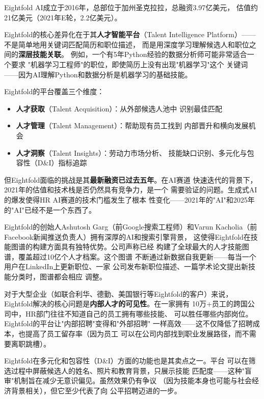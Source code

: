 Eightfold AI成立于2016年，总部位于加州圣克拉拉，总融资3.97亿美元，
估值约21亿美元（2021年E轮，2.2亿美元）。

Eightfold的核心差异化在于其\textbf{人才智能平台}（Talent
Intelligence Platform）——不是简单地用关键词匹配简历和职位描述，
而是用深度学习理解候选人和职位之间的\textbf{深层技能关联}。
例如，一个有5年Python经验的数据分析师可能非常适合一个要求
"机器学习工程师"的职位，即使简历上没有出现"机器学习"这个
关键词——因为AI理解Python和数据分析是机器学习的基础技能。

Eightfold的平台覆盖三个维度：

\begin{itemize}
  \item \textbf{人才获取}（Talent Acquisition）：从外部候选人池中
    识别最佳匹配
  \item \textbf{人才管理}（Talent Management）：帮助现有员工找到
    内部晋升和横向发展机会
  \item \textbf{人才洞察}（Talent Insights）：劳动力市场分析、
    技能缺口识别、多元化与包容性（D\&I）指标追踪
\end{itemize}

但Eightfold面临的挑战是其\textbf{最新融资已过去五年}。在AI赛道
快速迭代的背景下，2021年的估值和技术栈是否仍然具有竞争力，是一个
需要验证的问题。生成式AI的爆发使得HR AI赛道的技术门槛发生了根本
性变化——2021年的"AI"和2025年的"AI"已经不是一个东西了。

Eightfold的创始人Ashutosh Garg（前Google搜索工程师）和Varun
Kacholia（前Facebook新闻推送负责人）拥有深厚的AI和搜索引擎背景，
这使得Eightfold在技能图谱的构建方面具有独特优势。公司声称已经
构建了全球最大的人才技能图谱，覆盖超过10亿个人才档案。这个图谱
不断通过新数据自我更新——每当一个用户在LinkedIn上更新职位、一家
公司发布新职位描述、一篇学术论文提出新技能分类时，图谱都会相应
调整。

对于大型企业（如联合利华、德勤、美国银行等Eightfold的客户）来说，
Eightfold解决的核心问题是\textbf{内部人才的可见性}。在一家拥有
10万+员工的跨国公司中，HR部门往往不知道自己的员工拥有哪些技能、
可以胜任哪些内部岗位。Eightfold的平台让"内部招聘"变得和"外部招聘"
一样高效——这不仅降低了招聘成本，也提高了员工留存率（因为员工
可以在公司内部找到职业发展路径，而不需要离职跳槽）。

Eightfold在多元化和包容性（D\&I）方面的功能也是其卖点之一。平台
可以在筛选过程中屏蔽候选人的姓名、照片和教育背景，只展示技能
匹配度——这种"盲审"机制旨在减少无意识偏见。虽然效果仍有争议
（因为技能本身也可能与社会经济背景相关），但它至少代表了向
公平招聘迈进的一步。

